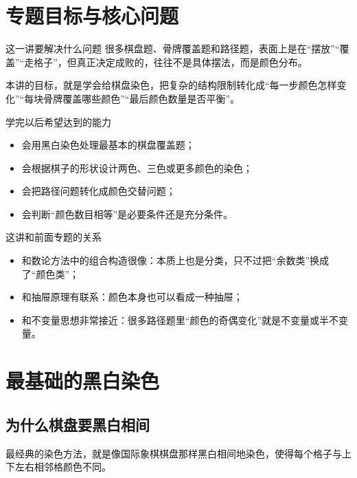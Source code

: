 \documentclass[11pt,a4paper,fontset=fandol]{ctexart}
\theoremstyle{formaltheorem}
\theoremstyle{formalexample}
\begin{document}
\pagestyle{plain}
\tableofcontents
\newpage
\pagestyle{fancy}

\section{专题目标与核心问题}

\begin{goalbox}{这一讲要解决什么问题}
很多棋盘题、骨牌覆盖题和路径题，表面上是在“摆放”“覆盖”“走格子”，但真正决定成败的，往往不是具体摆法，而是颜色分布。

本讲的目标，就是学会给棋盘染色，把复杂的结构限制转化成“每一步颜色怎样变化”“每块骨牌覆盖哪些颜色”“最后颜色数量是否平衡”。
\end{goalbox}

\begin{goalbox}{学完以后希望达到的能力}
\begin{itemize}
  \item 会用黑白染色处理最基本的棋盘覆盖题；
  \item 会根据棋子的形状设计两色、三色或更多颜色的染色；
  \item 会把路径问题转化成颜色交替问题；
  \item 会判断“颜色数目相等”是必要条件还是充分条件。
\end{itemize}
\end{goalbox}

\begin{notebox}{这讲和前面专题的关系}
\begin{itemize}
  \item 和数论方法中的组合构造很像：本质上也是分类，只不过把“余数类”换成了“颜色类”；
  \item 和抽屉原理有联系：颜色本身也可以看成一种抽屉；
  \item 和不变量思想非常接近：很多路径题里“颜色的奇偶变化”就是不变量或半不变量。
\end{itemize}
\end{notebox}

\section{最基础的黑白染色}

\subsection{为什么棋盘要黑白相间}
最经典的染色方法，就是像国际象棋棋盘那样黑白相间地染色，使得每个格子与上下左右相邻格颜色不同。
\end{document}
